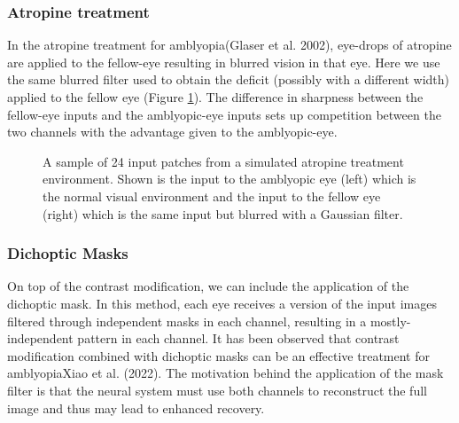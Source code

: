 \documentclass[
  sn-apa,
  pdflatex]{sn-jnl}
\theoremstyle{thmstyleone}%
\theoremstyle{thmstyletwo}%
\theoremstyle{thmstylethree}%
\begin{document}
\hypertarget{atropine-treatment}{%
\subsubsection{Atropine treatment}\label{atropine-treatment}}

In the atropine treatment for amblyopia(Glaser et al. 2002), eye-drops
of atropine are applied to the fellow-eye resulting in blurred vision in
that eye. Here we use the same blurred filter used to obtain the deficit
(possibly with a different width) applied to the fellow eye (Figure
\ref{fig:atropine-inputs}). The difference in sharpness between the
fellow-eye inputs and the amblyopic-eye inputs sets up competition
between the two channels with the advantage given to the amblyopic-eye.

\begin{figure}
\hypertarget{fig:atropine-inputs}{%
\centering

\caption{A sample of 24 input patches from a simulated atropine
treatment environment. Shown is the input to the amblyopic eye (left)
which is the normal visual environment and the input to the fellow eye
(right) which is the same input but blurred with a Gaussian
filter.}\label{fig:atropine-inputs}
}
\end{figure}

\hypertarget{dichoptic-masks}{%
\subsubsection{Dichoptic Masks}\label{dichoptic-masks}}

On top of the contrast modification, we can include the application of
the dichoptic mask. In this method, each eye receives a version of the
input images filtered through independent masks in each channel,
resulting in a mostly-independent pattern in each channel. It has been
observed that contrast modification combined with dichoptic masks can be
an effective treatment for amblyopiaXiao et al. (2022). The motivation
behind the application of the mask filter is that the neural system must
use both channels to reconstruct the full image and thus may lead to
enhanced recovery.
\end{document}
